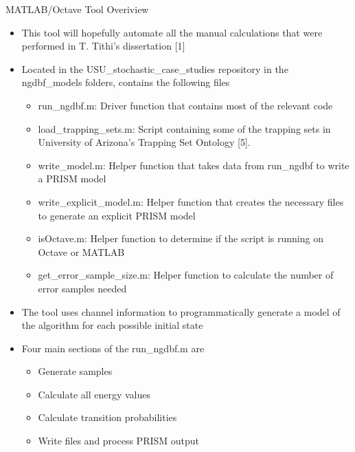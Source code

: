\documentclass[10pt,ignorenonframetext,]{beamer}
\providecommand{\tightlist}{%
  \setlength{\itemsep}{0pt}\setlength{\parskip}{0pt}}
\begin{document}
\begin{frame}{MATLAB/Octave Tool Overiview}
\protect\hypertarget{matlaboctave-tool-overiview}{}
\begin{itemize}[<+->]
\tightlist
\item
  This tool will hopefully automate all the manual calculations that
  were performed in T. Tithi's dissertation {[}1{]}
\item
  Located in the USU\_stochastic\_case\_studies repository in the
  ngdbf\_models folders, contains the following files

  \begin{itemize}[<+->]
  \tightlist
  \item
    run\_ngdbf.m: Driver function that contains most of the relevant
    code
  \item
    load\_trapping\_sets.m: Script containing some of the trapping sets
    in University of Arizona's Trapping Set Ontology {[}5{]}.
  \item
    write\_model.m: Helper function that takes data from run\_ngdbf to
    write a PRISM model
  \item
    write\_explicit\_model.m: Helper function that creates the necessary
    files to generate an explicit PRISM model
  \item
    isOctave.m: Helper function to determine if the script is running on
    Octave or MATLAB
  \item
    get\_error\_sample\_size.m: Helper function to calculate the number
    of error samples needed
  \end{itemize}
\item
  The tool uses channel information to programmatically generate a model
  of the algorithm for each possible initial state
\item
  Four main sections of the run\_ngdbf.m are

  \begin{itemize}[<+->]
  \tightlist
  \item
    Generate samples
  \item
    Calculate all energy values
  \item
    Calculate transition probabilities
  \item
    Write files and process PRISM output
  \end{itemize}
\end{itemize}
\end{frame}
\end{document}
